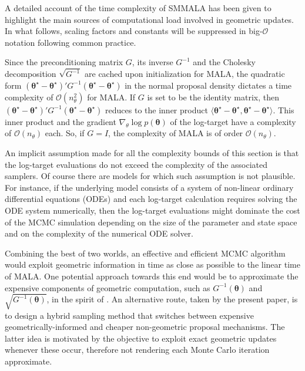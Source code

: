 \documentclass[twoside,11pt]{article}
\begin{document}
A detailed account of the time complexity of SMMALA has been given to highlight the main sources of computational load
involved in geometric updates. In what follows, scaling factors and constants will be suppressed in big-$\mathcal{O}$ 
notation following common practice.

Since the preconditioning matrix $G$, its inverse $G^{-1}$ and the Cholesky decomposition $\sqrt{G^{-1}}$ are cached upon 
initialization for MALA, the quadratic form
$
(\boldsymbol{\theta}^{\star}-\boldsymbol{\theta}^{\star})'
G^{-1}
(\boldsymbol{\theta}^{\star}-\boldsymbol{\theta}^{\star})
$
in the normal proposal density dictates a time complexity of $\mathcal{O}(n_{\theta}^2)$ for MALA. If $G$ is set to be the 
identity matrix, then
$
(\boldsymbol{\theta}^{\star}-\boldsymbol{\theta}^{\star})'
G^{-1}
(\boldsymbol{\theta}^{\star}-\boldsymbol{\theta}^{\star})
$
reduces to the inner product
$
\langle\boldsymbol{\theta}^{\star}-\boldsymbol{\theta}^{\star},
\boldsymbol{\theta}^{\star}-\boldsymbol{\theta}^{\star}\rangle
$. This inner product and the gradient $\nabla_{\theta}\log{p(\boldsymbol{\theta})}$  of the log-target have a complexity of 
$\mathcal{O}(n_{\theta})$ each. So, if $G=I$, the complexity of MALA is of order $\mathcal{O}(n_{\theta})$.

An implicit assumption made for all the complexity bounds of this section is that the log-target evaluations do not
exceed the complexity of the associated samplers. Of course there are models for which such assumption is not plausible.
For instance, if the underlying model consists of a system of non-linear ordinary differential equations (ODEs) and each 
log-target calculation requires solving the ODE system numerically, then the log-target evaluations might dominate the
cost of the MCMC simulation depending on the size of the parameter and state space and on the complexity of the numerical 
ODE solver.

Combining the best of two worlds, an effective and efficient MCMC algorithm would exploit geometric information in time as 
close as possible to the linear time of MALA. One potential approach towards this end would be to approximate the expensive 
components of geometric computation, such as $G^{-1}(\boldsymbol{\theta})$ and $\sqrt{G^{-1}(\boldsymbol{\theta})}$, in the 
spirit of \cite{sim_bad_cem__sto}. An alternative route, taken by the present paper, is to design a hybrid sampling method 
that switches between expensive geometrically-informed and cheaper non-geometric proposal mechanisms. The latter idea is
motivated by the objective to exploit exact geometric updates whenever these occur, therefore not rendering each Monte Carlo 
iteration approximate.
\end{document}
